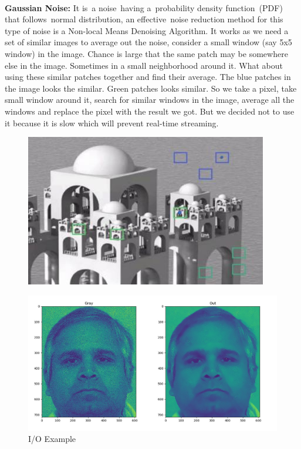 \paragraph{}
\textbf{Gaussian Noise:}\newline
It is a noise having a probability density function (PDF) that follows normal distribution, an effective noise reduction method for this type of noise is a Non-local Means Denoising Algorithm.\newline
It works as we need a set of similar images to average out the noise, consider a small window (say 5x5 window) in the image. Chance is large that the same patch may be somewhere else in the image. Sometimes in a small neighborhood around it. What about using these similar patches together and find their average.\newline
The blue patches in the image looks the similar. Green patches looks similar. So we take a pixel, take small window around it, search for similar windows in the image, average all the windows and replace the pixel with the result we got.\newline
But we decided not to use it because it is slow which will prevent real-time streaming.
\begin{figure}[H]
	\centering
	\includegraphics[width=\linewidth]{images/nlmd.jpg}
\end{figure}

\begin{figure}[H]
	\centering
	\includegraphics[width=\linewidth]{images/gaussian.jpg}
	\caption{I/O Example}
\end{figure}

